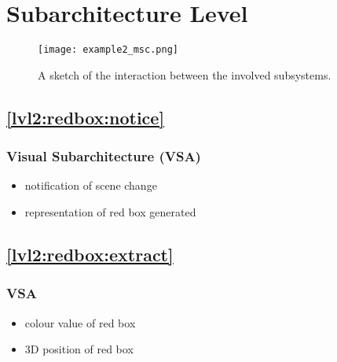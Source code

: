 \documentclass{article}
\begin{document}
\section{Subarchitecture Level}

\begin{figure}[ht]
\begin{center}
\texttt{[image: example2\_msc.png]}
\end{center}
\caption{
A sketch of the interaction between the involved subsystems.
}
\label{fig:lvl2}
\end{figure}



\subsection{\ref{lvl2:redbox:notice}}

\subsubsection{Visual Subarchitecture (VSA)}

\begin{itemize}

\item notification of scene change

\item representation of red box generated

\end{itemize}


\subsection{\ref{lvl2:redbox:extract}}

\subsubsection{VSA}

\begin{itemize}

\item colour value of red box

\item 3D position of red box

\end{itemize}
 
\end{document}
